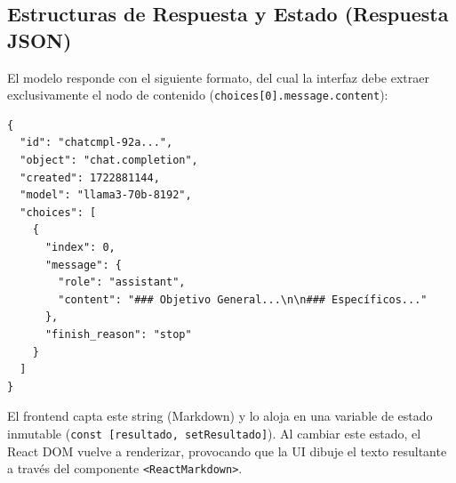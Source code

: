 \subsection{Estructuras de Respuesta y Estado (Respuesta JSON)}
El modelo responde con el siguiente formato, del cual la interfaz debe extraer exclusivamente el nodo de contenido (\texttt{choices[0].message.content}):

\begin{verbatim}
{
  "id": "chatcmpl-92a...",
  "object": "chat.completion",
  "created": 1722881144,
  "model": "llama3-70b-8192",
  "choices": [
    {
      "index": 0,
      "message": {
        "role": "assistant",
        "content": "### Objetivo General...\n\n### Específicos..."
      },
      "finish_reason": "stop"
    }
  ]
}
\end{verbatim}
El frontend capta este string (Markdown) y lo aloja en una variable de estado inmutable (\texttt{const [resultado, setResultado]}). Al cambiar este estado, el React DOM vuelve a renderizar, provocando que la UI dibuje el texto resultante a través del componente \texttt{<ReactMarkdown>}.
